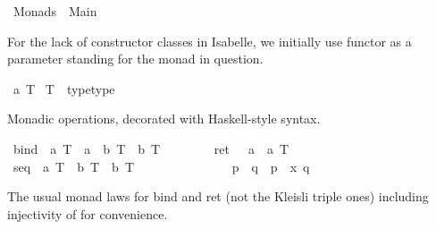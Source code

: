 %
\begin{isabellebody}%
\def\isabellecontext{Monads}%
%
\isamarkuptrue%
\ Monads\ {\isacharequal}\ Main{\isacharcolon}\isamarkupfalse%
%
\label{sec:monads-thy}
%
\begin{isamarkuptext}%
For the lack of constructor classes in Isabelle, we initially
 use functor  as a parameter standing for the monad in question.
 \label{isa:monads-def}%
\end{isamarkuptext}%
\isamarkuptrue%
\ {\isacharprime}a\ T\isanewline
\isanewline
\isamarkupfalse%
\ T\ {\isacharcolon}{\isacharcolon}\ {\isacharparenleft}type{\isacharparenright}type\isamarkupfalse%
%
\begin{isamarkuptext}%
Monadic operations, decorated with Haskell-style syntax.%
\end{isamarkuptext}%
\isamarkuptrue%
\isanewline
\ bind\ {\isacharcolon}{\isacharcolon}\ {\isachardoublequote}{\isacharprime}a\ T\ {\isasymRightarrow}\ {\isacharparenleft}{\isacharprime}a\ {\isasymRightarrow}\ {\isacharprime}b\ T{\isacharparenright}\ {\isasymRightarrow}\ {\isacharprime}b\ T{\isachardoublequote}\ \ \ \ \ {\isacharparenleft}\ {\isachardoublequote}{\isasymggreater}{\isacharequal}{\isachardoublequote}\ {}{}{\isacharparenright}\isanewline
\ ret\ \ {\isacharcolon}{\isacharcolon}\ {\isachardoublequote}{\isacharprime}a\ {\isasymRightarrow}\ {\isacharprime}a\ T{\isachardoublequote}\isanewline
\isanewline
\isamarkupfalse%
\isanewline
\ seq\ {\isacharcolon}{\isacharcolon}\ {\isachardoublequote}{\isacharprime}a\ T\ {\isasymRightarrow}\ {\isacharprime}b\ T\ {\isasymRightarrow}\ {\isacharprime}b\ T{\isachardoublequote}\ \ \ \ \ \ \ \ \ \ \ \ {\isacharparenleft}\ {\isachardoublequote}{\isasymggreater}{\isachardoublequote}\ {}{}{\isacharparenright}\isanewline
\ {\isachardoublequote}p\ {\isasymggreater}\ q\ {\isasymequiv}\ {\isacharparenleft}p\ {\isasymggreater}{\isacharequal}\ {\isacharparenleft}{\isasymlambda}x{\isachardot}\ q{\isacharparenright}{\isacharparenright}{\isachardoublequote}\isamarkupfalse%
%
\begin{isamarkuptext}%
The usual monad laws for bind and ret (not the Kleisli triple ones)
  including injectivity of  for convenience.
  \label{isa:monads-laws}%
\end{isamarkuptext}%
\isamarkuptrue%
\isanewline

\end{isabellebody}
